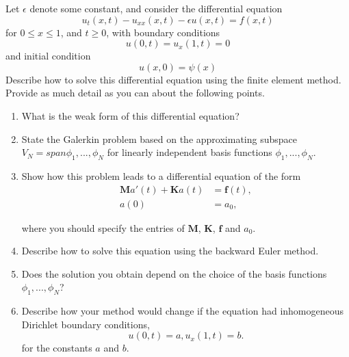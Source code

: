 Let $\epsilon$ denote some constant, and consider the differential equation
\[
u_t (x, t) - u_{xx} (x, t) - \epsilon u(x, t) = f(x, t)
\]
for $0 \leq x \leq 1$, and $t \geq 0$, with boundary conditions
\[
u(0, t) = u_x(1, t) = 0
\]
and initial condition
\[u(x, 0) = \psi(x)\]
Describe how to solve this differential equation using the finite element method.
Provide as much detail as you can about the following points.

\begin{enumerate}

\item What is the weak form of this differential equation?

\item State the Galerkin problem based on the approximating subspace $V_N = span{\phi_1, . . . , \phi_N }$
for linearly independent basis functions $\phi_1, . . . , \phi_N .$

\item Show how this problem leads to a differential equation of the form
\begin{align*}
\mathbf{M} a'(t) + \mathbf{K } a(t) &= \mathbf{f}(t), \\
										a(0) &= a_0, 
 \end{align*}
 
 where you should specify the entries of $\mathbf{M}$, $\mathbf{K}$, $\mathbf{f}$ and $a_0$.
\item Describe how to solve this equation using the backward Euler method.
\item Does the solution you obtain depend on the choice of the basis functions $\phi_1, . . . , \phi_N $?
\item Describe how your method would change if the equation had inhomogeneous Dirichlet
boundary conditions,
\[
u(0, t) = a, u_x(1, t) = b.
\]
for the constants $a$ and $b$.
\end{enumerate}
